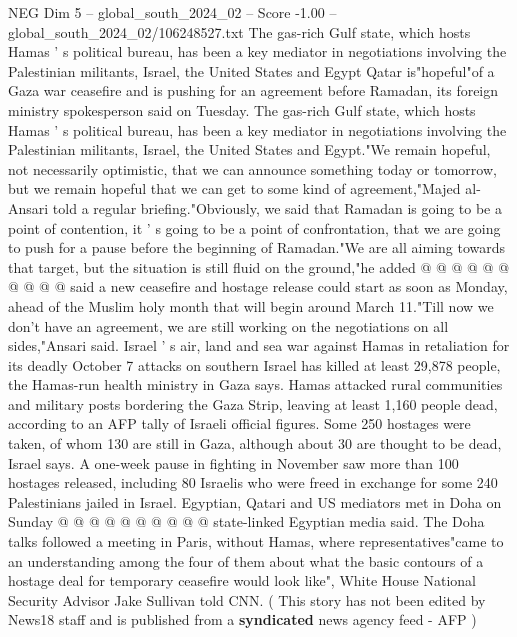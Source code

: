 \begin{textsample}{NEG Dim 5 – global\_south\_2024\_02 – Score -1.00 – global\_south\_2024\_02/106248527.txt}  \label{ex:f5_neg_253}
The gas-rich Gulf state, which hosts Hamas ' s political bureau, has been a key mediator in negotiations involving the Palestinian militants, Israel, the United States and Egypt Qatar is"hopeful"of a Gaza war ceasefire and is pushing for an agreement before Ramadan, its foreign ministry spokesperson said on Tuesday.
The gas-rich Gulf state, which hosts Hamas ' s political bureau, has been a key mediator in negotiations involving the Palestinian militants, Israel, the United States and Egypt."We remain hopeful, not necessarily optimistic, that we can announce something today or tomorrow, but we remain hopeful that we can get to some kind of agreement,"Majed al-Ansari told a regular briefing."Obviously, we said that Ramadan is going to be a point of contention, it ' s going to be a point of confrontation, that we are going to push for a pause before the beginning of Ramadan."We are all aiming towards that target, but the situation is still fluid on the ground,"he added @ @ @ @ @ @ @ @ @ @ said a new ceasefire and hostage release could start as soon as Monday, ahead of the Muslim holy month that will begin around March 11."Till now we don't have an agreement, we are still working on the negotiations on all sides,"Ansari said.
Israel ' s air, land and sea war against Hamas in retaliation for its deadly October 7 attacks on southern Israel has killed at least 29,878 people, the Hamas-run health ministry in Gaza says.
Hamas attacked rural communities and military posts bordering the Gaza Strip, leaving at least 1,160 people dead, according to an AFP tally of Israeli official figures.
Some 250 hostages were taken, of whom 130 are still in Gaza, although about 30 are thought to be dead, Israel says.
A one-week pause in fighting in November saw more than 100 hostages released, including 80 Israelis who were freed in exchange for some 240 Palestinians jailed in Israel.
Egyptian, Qatari and US mediators met in Doha on Sunday @ @ @ @ @ @ @ @ @ @ state-linked Egyptian media said.
The Doha talks followed a meeting in Paris, without Hamas, where representatives"came to an understanding among the four of them about what the basic contours of a hostage deal for temporary ceasefire would look like", White House National Security Advisor Jake Sullivan told CNN. ( This story has not been edited by News18 staff and is published from a \textbf{syndicated} news agency feed - AFP )

\end{textsample}
